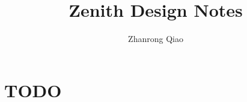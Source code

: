 \documentclass[11pt]{article}
\title{Zenith Design Notes}
\author{Zhanrong Qiao}
\begin{document}
\maketitle

\section{TODO}

\cite{jacobs1993comprehension}



\end{document}
